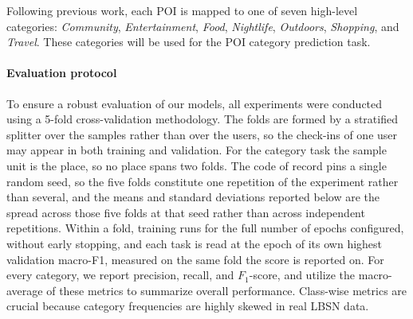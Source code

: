 Following previous work, each POI is mapped to one of seven high-level categories: \emph{Community}, \emph{Entertainment}, \emph{Food}, \emph{Nightlife}, \emph{Outdoors}, \emph{Shopping}, and \emph{Travel}. These categories will be used for the POI category prediction task.

\paragraph*{Evaluation protocol}
To ensure a robust evaluation of our models, all experiments were conducted using a 5-fold cross-validation methodology. %
The folds are formed by a stratified splitter over the samples rather than over the users, so the check-ins of one user may appear in both training and validation. For the category task the sample unit is the place, so no place spans two folds. The code of record pins a single random seed, so the five folds constitute one repetition of the experiment rather than several, and the means and standard deviations reported below are the spread across those five folds at that seed rather than across independent repetitions. Within a fold, training runs for the full number of epochs configured, without early stopping, and each task is read at the epoch of its own highest validation macro-F1, measured on the same fold the score is reported on. For every category, we report precision, recall, and $F_{1}$-score, and utilize the macro-average of these metrics to summarize overall performance. Class-wise metrics are crucial because category frequencies are highly skewed in real LBSN data.
